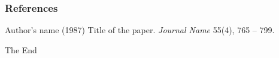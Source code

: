 \documentclass[12pt]{beamer}
\begin{document}
\begin{frame}
\frametitle{References}
\footnotesize{
\begin{thebibliography}{99}
  Author's name (1987)
 \newblock Title of the paper.
 \newblock \emph{Journal Name} 55(4), 765 -- 799.
\end{thebibliography}
}
\end{frame}

\begin{frame}
\centerline{The End}
\end{frame}


\end{document}

